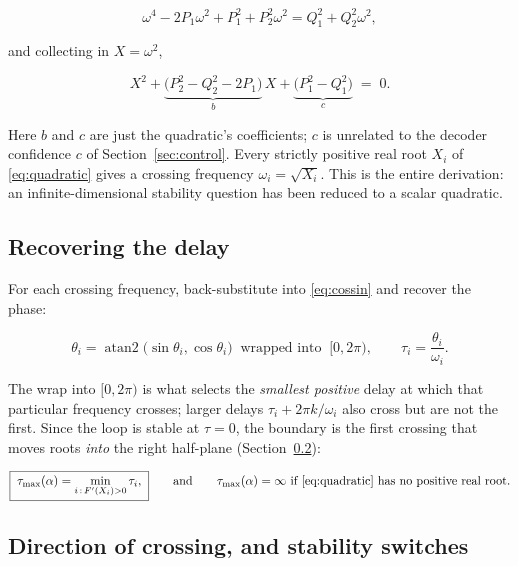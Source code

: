 \documentclass[11pt,a4paper]{article}
\theoremstyle{plain}
\theoremstyle{definition}
\begin{document}
\begin{equation}
\omega^{4} - 2P_1\omega^{2} + P_1^{2} + P_2^{2}\omega^{2}
= Q_1^{2} + Q_2^{2}\omega^{2},
\end{equation}

and collecting in $X = \omega^{2}$,

\begin{equation}
\boxed{\;
X^{2} + \underbrace{\bigl(P_2^{2} - Q_2^{2} - 2P_1\bigr)}_{b}\,X
+ \underbrace{\bigl(P_1^{2} - Q_1^{2}\bigr)}_{c} \;=\; 0. \;}
\label{eq:quadratic}
\end{equation}

Here $b$ and $c$ are just the quadratic's coefficients; $c$ is
unrelated to the decoder confidence $c$ of Section~\ref{sec:control}.
Every strictly positive real root $X_i$ of \eqref{eq:quadratic} gives a
crossing frequency $\omega_i = \sqrt{X_i}$. This is the entire
derivation: an infinite-dimensional stability question has been reduced
to a scalar quadratic.

\subsection{Recovering the delay}

For each crossing frequency, back-substitute into \eqref{eq:cossin} and
recover the phase:

\begin{equation}
\theta_i = \operatorname{atan2}\bigl(\sin\theta_i, \cos\theta_i\bigr)
\;\;\text{wrapped into}\;\; [0, 2\pi),
\qquad
\tau_i = \frac{\theta_i}{\omega_i}.
\label{eq:taui}
\end{equation}

The wrap into $[0, 2\pi)$ is what selects the \emph{smallest positive}
delay at which that particular frequency crosses; larger delays
$\tau_i + 2\pi k/\omega_i$ also cross but are not the first. Since the
loop is stable at $\tau = 0$, the boundary is the first crossing that
moves roots \emph{into} the right half-plane (Section~\ref{sec:direction}):

\begin{equation}
\boxed{\;\tau_{\max}(\alpha) = \min_{i\,:\,F'(X_i) > 0} \tau_i,\;}
\qquad\text{and}\qquad
\tau_{\max}(\alpha) = \infty
\text{ if \eqref{eq:quadratic} has no positive real root.}
\label{eq:taumax}
\end{equation}

\subsection{Direction of crossing, and stability switches}
\label{sec:direction}
\end{document}
